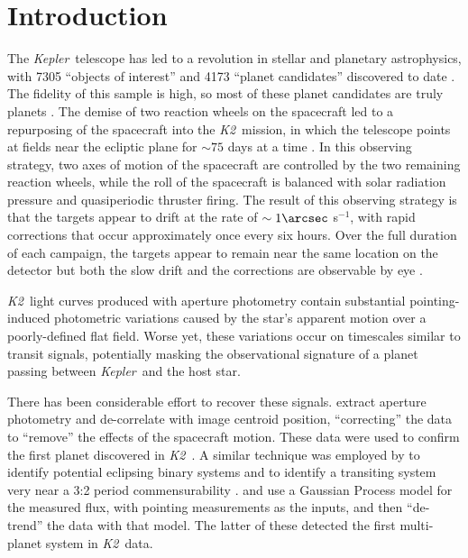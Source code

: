 \documentclass{emulateapj}
\newcommand{\project}[1]{\textsl{#1}}
\newcommand{\kep}{\project{Kepler}}
\newcommand{\KT}{\project{K2}}
\newcommand{\todo}[3]{{\color{#2} \emph{#1} TO DO: #3}}
\newcommand{\btmtodo}[1]{\todo{BEN}{red}{#1}}
\begin{document}
\keywords{\btmtodo{Keywords}}

\maketitle

\section{Introduction}
The \kep\ telescope \citep{Borucki10} has led to a revolution in stellar and planetary
astrophysics, with 7305 ``objects of interest'' and 4173 ``planet candidates''
discovered to date \citep{Borucki11a, Borucki11b, Batalha13, Burke14, Rowe15, Mullaly15}.
The fidelity of this sample is high, so most of these planet candidates are truly planets
\citep{Morton11b, Fressin13}.
The demise of two reaction wheels on the spacecraft led to a repurposing
of the spacecraft into the \KT\ mission, in which the telescope points at
fields near the ecliptic plane for $\sim 75$ days at a time \citep{Howell14}.
In this observing strategy, two axes of motion of the spacecraft are
controlled by the two remaining reaction wheels, while the roll of the
spacecraft is balanced with solar radiation pressure and quasiperiodic
thruster firing.
The result of this observing strategy is that the targets appear to drift
at the rate of $\sim 1\arcsec$ s$^{-1}$, with rapid corrections that occur
approximately once every six hours.
Over the full duration of each campaign, the targets appear to remain near the
same location on the detector but both the slow drift and the corrections are
observable by eye \citep{Barentsen15}.

\KT\ light curves produced with aperture photometry contain substantial pointing-induced
photometric variations caused by the star's apparent motion over a poorly-defined flat
field.
Worse yet, these variations occur on timescales similar to transit signals, potentially
masking the observational signature of a planet passing between \kep\ and the host star.

There has been considerable effort to recover these signals.
\citet{Vanderburg14} extract aperture photometry and de-correlate with image centroid
position, ``correcting'' the data to ``remove'' the effects of the spacecraft motion.
These data were used to confirm the first planet discovered in \KT\ \citep{Vanderburg15}.
A similar technique was employed by \citet{Armstrong15a} to identify potential eclipsing
binary systems and to identify a transiting system very near a 3:2 period commensurability
\citep{Armstrong15b}.
\citet{Aigrain15} and \citet{Crossfield15} use a Gaussian Process model for the measured
flux, with pointing measurements as the inputs, and then ``de-trend'' the data with that model.
The latter of these detected the first multi-planet system in \KT\ data.
\end{document}
